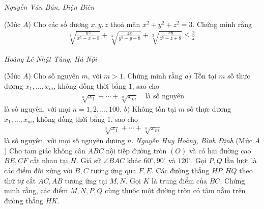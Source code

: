\begin{multicols}{2}
\begin{figure}[H]
		\vspace*{-10pt}
	\end{figure}
	\begin{flushright}
		\textit{\small Nguyễn Văn Bản, Điện Biên}
	\end{flushright}
	{\color{thachthuctoanhoc}{\usefont{T5}{qag}{b}{n} P697.}}
	(Mức $A$) Cho các số dương $x,y,z$ thoả mãn $x^2+y^2+z^2=3$. Chứng minh rằng
	\begin{align*}
		\sqrt[3]{\frac{y z}{x^5\!-\!x\!+\!8}}\!+\!\sqrt[3]{\frac{z x}{y^5\!-\!y\!+\!8}}\!+\!\sqrt[3]{\frac{x y}{z^5\!-\!z\!+\!8}} \!\le\! \frac{3}{2}.
	\end{align*}
	\begin{flushright}
		\textit{Hoàng Lê Nhật Tùng, Hà Nội}
	\end{flushright}
	{}
	(Mức $A$) Cho số nguyên $m$, với $m>1$. Chứng minh rằng
	\vskip 0.05cm
	$a)$ Tồn tại $m$ số thực dương $x_1,\ldots,x_m$, không đồng thời bằng $1$, sao cho
	\begin{align*}
		\sqrt[n]{x_1}+\cdots+\sqrt[n]{x_m}\quad\text{là số nguyên}
	\end{align*}
	là số nguyên, với mọi $n=1,2,\ldots,100$.
	\vskip 0.05cm
	$b)$ Không tồn  tại $m$ số thực dương $x_1,\ldots,x_m$, không đồng thời bằng $1$, sao cho
	\begin{align*}
		\sqrt[n]{x_1}+\cdots+\sqrt[n]{x_m}
	\end{align*}
	là số nguyên, với mọi số nguyên dương $n$.
	\vskip 0.05cm
	\hfill	\textit{\small Nguyễn Huy Hoàng, Bình Định}
	\vskip 0.05cm
	\columnbreak
	{}
	(Mức $A$) Cho tam giác không cân $ABC$ nội tiếp đường tròn $(O)$ và có hai đường cao $BE,CF$ cắt nhau tại $H$. Giả sử   $\angle BAC$ khác $60^\circ,90^\circ$ và $120^\circ$.  Gọi $P, Q$ lần lượt là các điểm đối xứng với $B,C $ tương ứng qua $F, E$. Các đường thẳng $HP, HQ$ theo thứ tự cắt $AC, AB$ tương ứng tại $M, N$.  Gọi $K$ là trung điểm của $BC$. Chứng minh rằng, các điểm $M, N, P, Q$ cùng thuộc một đường tròn có tâm nằm trên đường thẳng $HK$.

\end{multicols}
